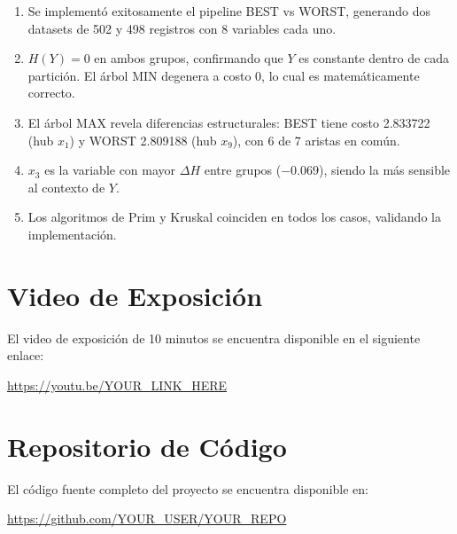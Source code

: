 \documentclass[12pt, a4paper]{article}
\begin{document}
\begin{enumerate}
    \item Se implementó exitosamente el pipeline BEST vs WORST,
          generando dos datasets de 502 y 498 registros con 8
          variables cada uno.

    \item $H(Y)=0$ en ambos grupos, confirmando que $Y$ es constante
          dentro de cada partición. El árbol MIN degenera a costo 0,
          lo cual es matemáticamente correcto.

    \item El árbol MAX revela diferencias estructurales: BEST tiene
          costo 2.833722 (hub $x_1$) y WORST 2.809188 (hub $x_9$),
          con 6 de 7 aristas en común.

    \item $x_3$ es la variable con mayor $\Delta H$ entre grupos
          ($-0.069$), siendo la más sensible al contexto de $Y$.

    \item Los algoritmos de Prim y Kruskal coinciden en todos los
          casos, validando la implementación.
\end{enumerate}

\section{Video de Exposición}

El video de exposición de 10 minutos se encuentra disponible en el
siguiente enlace:

\begin{center}
\url{https://youtu.be/YOUR\_LINK\_HERE}
\end{center}

\section{Repositorio de Código}

El código fuente completo del proyecto se encuentra disponible en:

\begin{center}
\url{https://github.com/YOUR\_USER/YOUR\_REPO}
\end{center}
\end{document}
